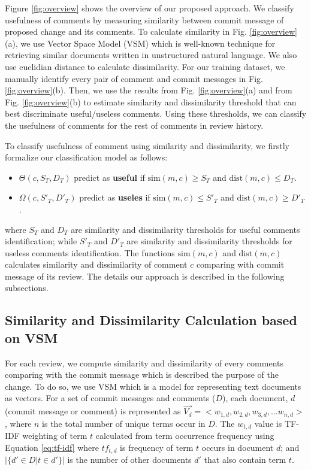 \documentclass[conference]{IEEEtran}
\begin{document}
Figure \ref{fig:overview} shows the overview of our proposed approach. We classify usefulness of comments by measuring similarity between commit message of proposed change and its comments. To calculate similarity in Fig. \ref{fig:overview}(a), we use Vector Space Model (VSM) which is well-known technique for retrieving similar documents written in unstructured natural language. We also use euclidian distance to calculate dissimilarity. For our training dataset, we manually identify every pair of comment and commit messages in Fig. \ref{fig:overview}(b). Then, we use the results from Fig. \ref{fig:overview}(a) and from Fig. \ref{fig:overview}(b) to estimate similarity and dissimilarity threshold that can best discriminate useful/useless comments. Using these thresholds, we can classify the usefulness of comments for the rest of comments in review history. 

To classify usefulness of comment using similarity and dissimilarity, we firstly formalize our classification model as follows:
\begin{itemize}
\item $\Theta(c,S_T,D_T)$ predict as \textbf{useful} if $\mathrm{sim}(m,c) \geq S_T$ and $\mathrm{dist}(m,c) \leq D_T$.
\item $\Omega(c,S'_T,D'_T)$ predict as \textbf{useles} if $\mathrm{sim}(m,c) \leq  S'_T$ and $\mathrm{dist}(m,c) \geq D'_T$.
\end{itemize}
where $S_T$ and $D_T$ are similarity and dissimilarity thresholds for useful comments identification; while $S'_T$ and $D'_T$ are similarity and dissimilarity thresholds for useless comments identification. The functions $\mathrm{sim}(m,c)$ and $\mathrm{dist}(m,c)$ calculates similarity and dissimilarity of comment $c$ comparing with commit message of its review. The details our approach is described in the following subsections.

\subsection{Similarity and Dissimilarity Calculation based on VSM}
For each review, we compute similarity and dissimilarity of every comments comparing with the commit message which is described the purpose of the change.
To do so, we use VSM which is a model for representing text documents as vectors. For a set of commit messages and comments ($D$), each document, $d$ (commit message or comment) is represented as $\overrightarrow{V_d} = <w_{1,d},w_{2,d},w_{3,d},...w_{n,d}>$, where $n$ is the total number of unique terms occur in $D$. The $w_{t,d}$ value is TF-IDF weighting of term $t$ calculated from term occurrence frequency using Equation \ref{eq:tf-idf} where $tf_{t,d}$ is frequency of term $t$ occurs in document $d$; and $|\{d' \in D | t \in d'\}|$ is the number of other documents $d'$ that also contain term $t$.  
\end{document}
